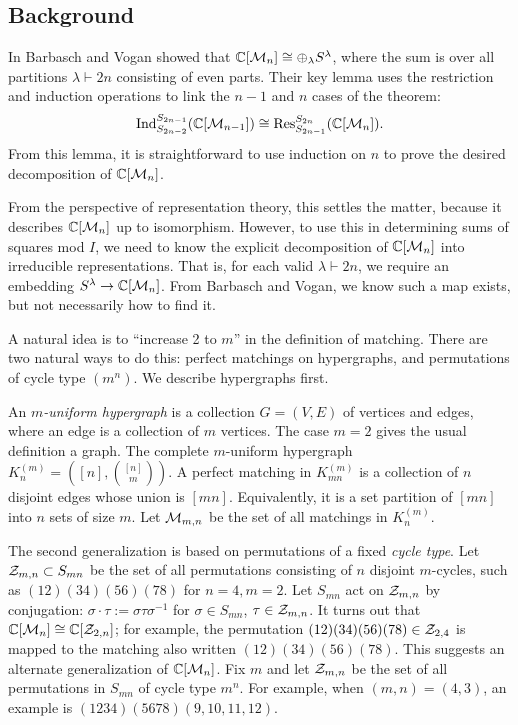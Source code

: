 \subsection{Background}
In \cite{bv} Barbasch and Vogan showed that $\mathbb{C}[\mathcal{M}_{n}] \cong \oplus_\lambda S^\lambda$, where the sum is over all partitions $\lambda \vdash 2n$ consisting of even parts.
Their key lemma uses the restriction and induction operations to link the $n-1$ and $n$ cases of the theorem:
$$ \textup{Ind}_{S_{2n-2}}^{S_{2n-1}}(\mathbb{C}[\mathcal{M}_{n-1}]) \cong \textup{Res}_{S_{2n-1}}^{S_{2n}}( \mathbb{C}[\mathcal{M}_{n}]).$$ 
From this lemma, it is straightforward to use induction on $n$ to prove the desired decomposition of $\mathbb{C}[\mathcal{M}_{n}]$.

From the perspective of representation theory, this settles the matter, because it describes $\mathbb{C}[\mathcal{M}_{n}]$ up to isomorphism.
However, to use this in determining sums of squares mod $I$, we need to know the explicit decomposition of $\mathbb{C}[\mathcal{M}_{n}]$ into irreducible representations.
That is, for each valid $\lambda \vdash 2n$, we require an embedding $S^\lambda \to \mathbb{C}[\mathcal{M}_{n}]$.
From Barbasch and Vogan, we know such a map exists, but not necessarily how to find it.

A natural idea is to ``increase 2 to $m$'' in the definition of matching.
There are two natural ways to do this: perfect matchings on hypergraphs, and permutations of cycle type $(m^n)$. We describe hypergraphs first.

An {\em $m$-uniform hypergraph} is a collection $G = (V,E)$ of vertices and edges, where an edge is a collection of $m$ vertices.
The case $m=2$ gives the usual definition a graph.
The complete $m$-uniform hypergraph $K^{(m)}_n = ([n],{{[n]} \choose m})$.
A perfect matching in $K^{(m)}_{mn}$ is a collection of $n$ disjoint edges whose union is $[mn]$.
Equivalently, it is a set partition of $[mn]$ into $n$ sets of size $m$.
Let $\mathcal{M}_{m,n}$ be the set of all matchings in $K^{(m)}_n$.

The second generalization is based on permutations of a fixed {\em cycle type}.
Let $\mathcal{Z}_{m,n} \subset S_{mn}$ be the set of all permutations consisting of $n$ disjoint $m$-cycles, such as $(12)(34)(56)(78)$ for $n=4,m=2$.
Let $S_{mn}$ act on $\mathcal{Z}_{m,n}$ by conjugation: $\sigma \cdot \tau := \sigma \tau \sigma^{-1}$ for $\sigma \in S_{mn}$, $\tau \in \mathcal{Z}_{m,n}$.
It turns out that $\mathbb{C}[\mathcal{M}_n] \cong \mathbb{C}[\mathcal{Z}_{2,n}]$; for example, the permutation $(12)(34)(56)(78) \in \mathcal{Z}_{2,4}$ is mapped to the matching also written $(12)(34)(56)(78)$.
This suggests an alternate generalization of $\mathbb{C}[\mathcal{M}_n]$.
Fix $m$ and let $\mathcal{Z}_{m,n}$ be the set of all permutations in $S_{mn}$ of cycle type $m^n$.
For example, when $(m,n) = (4,3)$, an example is $(1234)(5678)(9,10,11,12)$.

